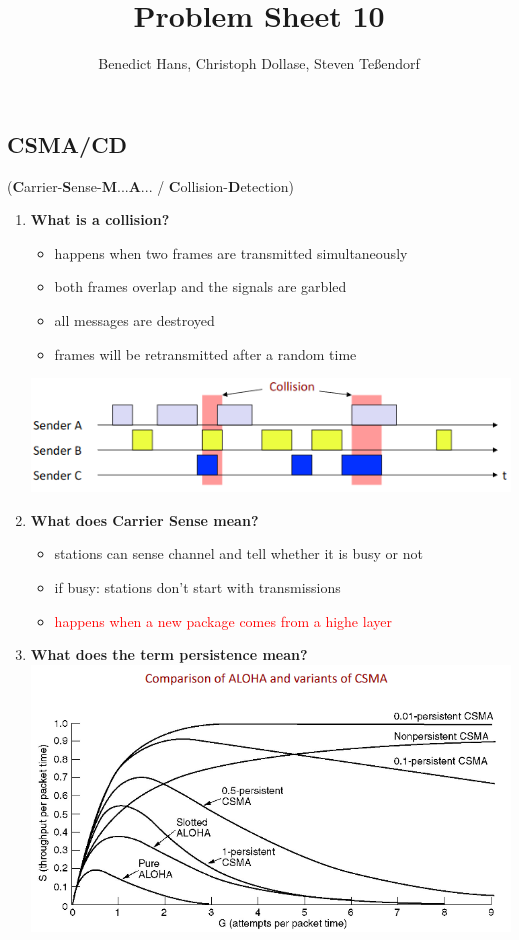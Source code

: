 \documentclass[a4paper,12pt]{article}
\author{Benedict Hans, Christoph Dollase, Steven Te\ss endorf}
\title{ \textbf{Problem Sheet 10}}
\begin{document}
	 
	\maketitle	 %
	
	\subsection{CSMA/CD} (\textbf{C}arrier-\textbf{S}ense-\textbf{M}...\textbf{A}... / \textbf{C}ollision-\textbf{D}etection)
	\begin{enumerate}[label=(\roman*),itemsep=0pt]
		\item \textbf{What is a collision?}
		\begin{itemize}[itemsep=0pt]
			\item  happens when two frames are transmitted simultaneously
			\item  both frames overlap and the signals are garbled
			\item  all messages are destroyed
			\item  frames will be retransmitted after a random time
		\end{itemize}
		\includegraphics[width=0.8\linewidth]{collision.png}
		\item \textbf{What does Carrier Sense mean?}
		\begin{itemize}[itemsep=0pt]
			\item  stations can sense channel and tell whether it is busy or not
			\item  if busy: stations don't start with transmissions
			\item \textcolor{red}{happens when a new package comes from a highe layer}
		\end{itemize}
		\item \textbf{What does the term persistence mean?}\\
		\includegraphics[width=0.75\linewidth]{csma.png}

\end{enumerate}
\end{document}
